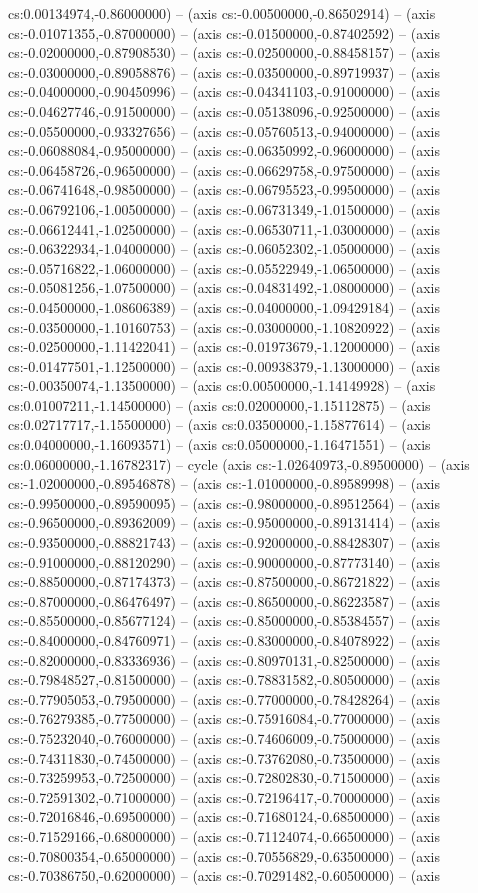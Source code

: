 cs:0.00134974,-0.86000000) -- (axis cs:-0.00500000,-0.86502914) -- (axis cs:-0.01071355,-0.87000000) -- (axis cs:-0.01500000,-0.87402592) -- (axis cs:-0.02000000,-0.87908530) -- (axis cs:-0.02500000,-0.88458157) -- (axis cs:-0.03000000,-0.89058876) -- (axis cs:-0.03500000,-0.89719937) -- (axis cs:-0.04000000,-0.90450996) -- (axis cs:-0.04341103,-0.91000000) -- (axis cs:-0.04627746,-0.91500000) -- (axis cs:-0.05138096,-0.92500000) -- (axis cs:-0.05500000,-0.93327656) -- (axis cs:-0.05760513,-0.94000000) -- (axis cs:-0.06088084,-0.95000000) -- (axis cs:-0.06350992,-0.96000000) -- (axis cs:-0.06458726,-0.96500000) -- (axis cs:-0.06629758,-0.97500000) -- (axis cs:-0.06741648,-0.98500000) -- (axis cs:-0.06795523,-0.99500000) -- (axis cs:-0.06792106,-1.00500000) -- (axis cs:-0.06731349,-1.01500000) -- (axis cs:-0.06612441,-1.02500000) -- (axis cs:-0.06530711,-1.03000000) -- (axis cs:-0.06322934,-1.04000000) -- (axis cs:-0.06052302,-1.05000000) -- (axis cs:-0.05716822,-1.06000000) -- (axis cs:-0.05522949,-1.06500000) -- (axis cs:-0.05081256,-1.07500000) -- (axis cs:-0.04831492,-1.08000000) -- (axis cs:-0.04500000,-1.08606389) -- (axis cs:-0.04000000,-1.09429184) -- (axis cs:-0.03500000,-1.10160753) -- (axis cs:-0.03000000,-1.10820922) -- (axis cs:-0.02500000,-1.11422041) -- (axis cs:-0.01973679,-1.12000000) -- (axis cs:-0.01477501,-1.12500000) -- (axis cs:-0.00938379,-1.13000000) -- (axis cs:-0.00350074,-1.13500000) -- (axis cs:0.00500000,-1.14149928) -- (axis cs:0.01007211,-1.14500000) -- (axis cs:0.02000000,-1.15112875) -- (axis cs:0.02717717,-1.15500000) -- (axis cs:0.03500000,-1.15877614) -- (axis cs:0.04000000,-1.16093571) -- (axis cs:0.05000000,-1.16471551) -- (axis cs:0.06000000,-1.16782317) -- cycle (axis cs:-1.02640973,-0.89500000) -- (axis cs:-1.02000000,-0.89546878) -- (axis cs:-1.01000000,-0.89589998) -- (axis cs:-0.99500000,-0.89590095) -- (axis cs:-0.98000000,-0.89512564) -- (axis cs:-0.96500000,-0.89362009) -- (axis cs:-0.95000000,-0.89131414) -- (axis cs:-0.93500000,-0.88821743) -- (axis cs:-0.92000000,-0.88428307) -- (axis cs:-0.91000000,-0.88120290) -- (axis cs:-0.90000000,-0.87773140) -- (axis cs:-0.88500000,-0.87174373) -- (axis cs:-0.87500000,-0.86721822) -- (axis cs:-0.87000000,-0.86476497) -- (axis cs:-0.86500000,-0.86223587) -- (axis cs:-0.85500000,-0.85677124) -- (axis cs:-0.85000000,-0.85384557) -- (axis cs:-0.84000000,-0.84760971) -- (axis cs:-0.83000000,-0.84078922) -- (axis cs:-0.82000000,-0.83336936) -- (axis cs:-0.80970131,-0.82500000) -- (axis cs:-0.79848527,-0.81500000) -- (axis cs:-0.78831582,-0.80500000) -- (axis cs:-0.77905053,-0.79500000) -- (axis cs:-0.77000000,-0.78428264) -- (axis cs:-0.76279385,-0.77500000) -- (axis cs:-0.75916084,-0.77000000) -- (axis cs:-0.75232040,-0.76000000) -- (axis cs:-0.74606009,-0.75000000) -- (axis cs:-0.74311830,-0.74500000) -- (axis cs:-0.73762080,-0.73500000) -- (axis cs:-0.73259953,-0.72500000) -- (axis cs:-0.72802830,-0.71500000) -- (axis cs:-0.72591302,-0.71000000) -- (axis cs:-0.72196417,-0.70000000) -- (axis cs:-0.72016846,-0.69500000) -- (axis cs:-0.71680124,-0.68500000) -- (axis cs:-0.71529166,-0.68000000) -- (axis cs:-0.71124074,-0.66500000) -- (axis cs:-0.70800354,-0.65000000) -- (axis cs:-0.70556829,-0.63500000) -- (axis cs:-0.70386750,-0.62000000) -- (axis cs:-0.70291482,-0.60500000) -- (axis 
